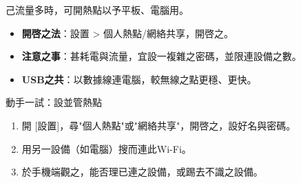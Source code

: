 
己流量多時，可開熱點以予平板、電腦用。

\begin{itemize}
  \item \textbf{開啓之法}：設置 > 個人熱點/網絡共享，開啓之。
  \item \textbf{注意之事}：甚耗電與流量，宜設一複雜之密碼，並限連設備之數。
  \item \textbf{USB之共}：以數據線連電腦，較無線之點更穩、更快。
\end{itemize}

\begin{tcbpractice}{動手一試：設並管熱點}
\begin{enumerate}
  \item 開 [設置]，尋"個人熱點"或"網絡共享"，開啓之，設好名與密碼。
  \item 用另一設備（如電腦）搜而連此Wi-Fi。
  \item 於手機端觀之，能否理已連之設備，或踢去不識之設備。
\end{enumerate}

\end{tcbpractice}
